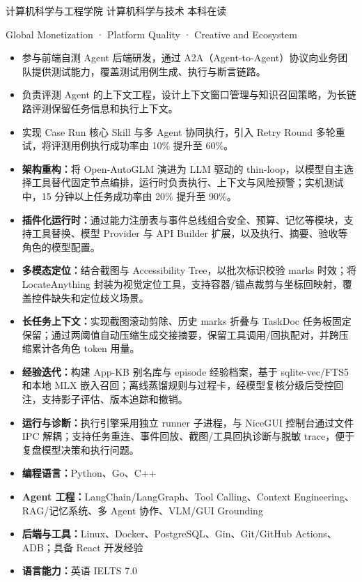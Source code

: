 计算机科学与工程学院 \quad 计算机科学与技术 \hfill 本科在读

Global Monetization · Platform Quality · Creative and Ecosystem
\begin{itemize}
  \item 参与前端自测 Agent 后端研发，通过 A2A（Agent-to-Agent）协议向业务团队提供测试能力，覆盖测试用例生成、执行与断言链路。
  \item 负责评测 Agent 的上下文工程，设计上下文窗口管理与知识召回策略，为长链路评测保留任务信息和执行上下文。
  \item 实现 Case Run 核心 Skill 与多 Agent 协同执行，引入 Retry Round 多轮重试，将评测用例执行成功率由 10\% 提升至 60\%。
\end{itemize}

\begin{itemize}
  \item \textbf{架构重构：}将 Open-AutoGLM 演进为 LLM 驱动的 thin-loop，以模型自主选择工具替代固定节点编排，运行时负责执行、上下文与风险预警；实机测试中，15 分钟以上任务成功率由 20\% 提升至 90\%。
  \item \textbf{插件化运行时：}通过能力注册表与事件总线组合安全、预算、记忆等模块，支持工具替换、模型 Provider 与 API Builder 扩展，以及执行、摘要、验收等角色的模型配置。
  \item \textbf{多模态定位：}结合截图与 Accessibility Tree，以批次标识校验 marks 时效；将 \mbox{LocateAnything} 封装为视觉定位工具，支持容器/锚点裁剪与坐标回映射，覆盖控件缺失和定位歧义场景。
  \item \textbf{长任务上下文：}实现截图滚动剪除、历史 marks 折叠与 TaskDoc 任务板固定保留；通过两阈值自动压缩生成交接摘要，保留工具调用/回执配对，并跨压缩累计各角色 token 用量。
  \item \textbf{经验迭代：}构建 App-KB 别名库与 episode 经验档案，基于 sqlite-vec/FTS5 和本地 MLX 嵌入召回；离线蒸馏规则与过程卡，经模型复核分级后受控回注，支持影子评估、版本追踪和撤销。
  \item \textbf{运行与诊断：}执行引擎采用独立 runner 子进程，与 NiceGUI 控制台通过文件 IPC 解耦；支持任务重连、事件回放、截图/工具回执诊断与脱敏 trace，便于复盘模型决策和执行问题。
\end{itemize}

\begin{itemize}[parsep=0.5ex]
  \item \textbf{编程语言：}Python、Go、C++
  \item \textbf{Agent 工程：}LangChain/LangGraph、Tool Calling、Context Engineering、RAG/记忆系统、多 Agent 协作、VLM/GUI Grounding
  \item \textbf{后端与工具：}Linux、Docker、PostgreSQL、Gin、Git/GitHub Actions、ADB；具备 React 开发经验
  \item \textbf{语言能力：}英语 IELTS 7.0
\end{itemize}
